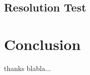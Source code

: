 \documentclass[extra,mreferee]{gji}
\begin{document}
\subsection{Resolution Test}

\section{Conclusion}


\begin{acknowledgments}
thanks blabla...
\end{acknowledgments}

\newpage


\end{document}
